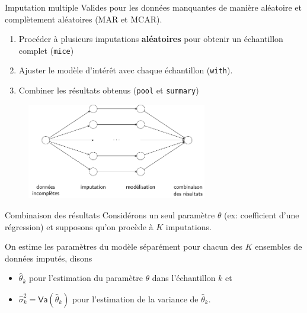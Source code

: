 \documentclass[
  ignorenonframetext,
]{beamer}
\providecommand{\tightlist}{%
  \setlength{\itemsep}{0pt}\setlength{\parskip}{0pt}}\usepackage{longtable,booktabs,array}
\begin{document}
\begin{frame}[fragile]{Imputation multiple}
\protect\hypertarget{imputation-multiple}{}
Valides pour les données manquantes de manière aléatoire et complètement
aléatoires (MAR et MCAR).

\begin{enumerate}
\tightlist
\item
  Procéder à plusieurs imputations \textbf{aléatoires} pour obtenir un
  échantillon complet (\texttt{mice})
\item
  Ajuster le modèle d'intérêt avec chaque échantillon (\texttt{with}).
\item
  Combiner les résultats obtenus (\texttt{pool} et \texttt{summary})
\end{enumerate}

\begin{figure}

{\centering \includegraphics[width=0.7\textwidth,height=\textheight]{figures/donnees_manquantes_workflow.pdf}

}

\end{figure}
\end{frame}

\begin{frame}{Combinaison des résultats}
\protect\hypertarget{combinaison-des-ruxe9sultats}{}
Considérons un seul paramètre \(\theta\) (ex: coefficient d'une
régression) et supposons qu'on procède à \(K\) imputations.

On estime les paramètres du modèle séparément pour chacun des \(K\)
ensembles de données imputés, disons

\begin{itemize}
\tightlist
\item
  \(\widehat{\theta}_k\) pour l'estimation du paramètre \(\theta\) dans
  l'échantillon \(k\) et
\item
  \(\widehat{\sigma}_k^2=\mathsf{Va}(\widehat{\theta}_k)\) pour
  l'estimation de la variance de \(\widehat{\theta}_k\).
\end{itemize}
\end{frame}
\end{document}
